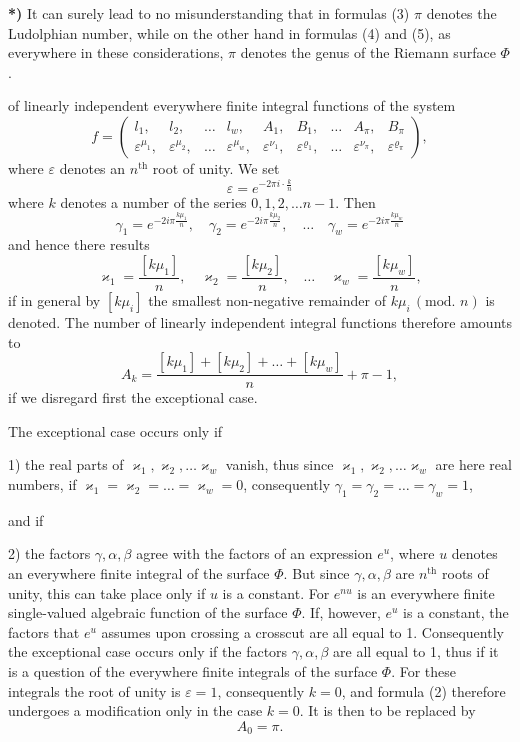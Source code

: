\documentclass{article}
\begin{document}
\textbf{*)} It can surely lead to no misunderstanding that in formulas (3) $\pi$ denotes the Ludolphian number, while on the other hand in formulas (4) and (5), as everywhere in these considerations, $\pi$ denotes the genus of the Riemann surface $\Phi$.

of linearly independent everywhere finite integral functions of the system
\[
f = \begin{pmatrix}
l_1, & l_2, & \dots & l_w, & A_1, & B_1, & \dots & A_\pi, & B_\pi \\
\varepsilon^{\mu_1}, & \varepsilon^{\mu_2}, & \dots & \varepsilon^{\mu_w}, & \varepsilon^{\nu_1}, & \varepsilon^{\varrho_1}, & \dots & \varepsilon^{\nu_\pi}, & \varepsilon^{\varrho_\pi}
\end{pmatrix},
\]
where $\varepsilon$ denotes an $n^{\text{th}}$ root of unity. We set
\[
\varepsilon = e^{-2\pi i \cdot \frac{k}{n}} \tag{1}
\]
where $k$ denotes a number of the series $0, 1, 2, \dots n-1$. Then
\[
\gamma_1 = e^{-2i\pi\frac{k\mu_1}{n}}, \quad \gamma_2 = e^{-2i\pi\frac{k\mu_2}{n}}, \quad \dots \quad \gamma_w = e^{-2i\pi\frac{k\mu_w}{n}}
\]
and hence there results
\[
\varkappa_1 = \frac{[k\mu_1]}{n}, \quad \varkappa_2 = \frac{[k\mu_2]}{n}, \quad \dots \quad \varkappa_w = \frac{[k\mu_w]}{n},
\]
if in general by $[k\mu_i]$ the smallest non-negative remainder of $k\mu_i\,(\text{mod. } n)$ is denoted. The number of linearly independent integral functions therefore amounts to
\[
A_k = \frac{[k\mu_1] + [k\mu_2] + \dots + [k\mu_w]}{n} + \pi - 1, \tag{2}
\]
if we disregard first the exceptional case.

The exceptional case occurs only if

1) the real parts of $\varkappa_1, \varkappa_2, \dots \varkappa_w$ vanish, thus since $\varkappa_1, \varkappa_2, \dots \varkappa_w$ are here real numbers, if $\varkappa_1 = \varkappa_2 = \dots = \varkappa_w = 0$, consequently $\gamma_1 = \gamma_2 = \dots = \gamma_w = 1$,

and if

2) the factors $\gamma, \alpha, \beta$ agree with the factors of an expression $e^u$, where $u$ denotes an everywhere finite integral of the surface $\Phi$. But since $\gamma, \alpha, \beta$ are $n^{\text{th}}$ roots of unity, this can take place only if $u$ is a constant. For $e^{nu}$ is an everywhere finite single-valued algebraic function of the surface $\Phi$. If, however, $e^u$ is a constant, the factors that $e^u$ assumes upon crossing a crosscut are all equal to 1. Consequently the exceptional case occurs only if the factors $\gamma, \alpha, \beta$ are all equal to 1, thus if it is a question of the everywhere finite integrals of the surface $\Phi$.
For these integrals the root of unity is $\varepsilon = 1$, consequently $k = 0$, and formula (2) therefore undergoes a modification only in the case $k = 0$. It is then to be replaced by
\[
A_0 = \pi. \tag{3}
\]
\end{document}
